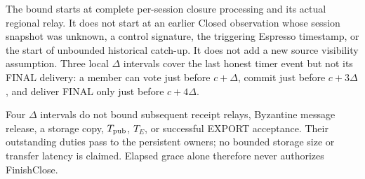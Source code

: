 \documentclass[11pt,a4paper]{article}
\begin{document}
The bound starts at complete per-session closure processing and its
actual regional relay. It does not start at an earlier Closed observation
whose session snapshot was unknown, a control signature, the triggering Espresso timestamp, or the
start of unbounded historical catch-up. It does not add a new source
visibility assumption. Three local $\Delta$ intervals cover the last
honest timer event but not its FINAL delivery: a member can vote just
before $c+\Delta$, commit just before $c+3\Delta$, and deliver FINAL
only just before $c+4\Delta$.

Four $\Delta$ intervals do not bound subsequent receipt relays,
Byzantine message release, a storage copy, $T_{\rm pub}$, $T_E$, or
successful EXPORT acceptance. Their outstanding duties pass to the
persistent owners; no bounded storage size or transfer latency is
claimed. Elapsed grace alone therefore never authorizes FinishClose.
\end{document}
